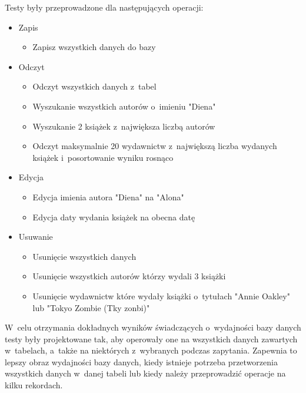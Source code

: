 Testy były przeprowadzone dla następujących operacji: 
\begin{itemize}
	 \item Zapis
  
  	\begin{itemize}
    		\item Zapisz wszystkich danych do bazy
	 \end{itemize}

	  \item Odczyt
	  
   	  \begin{itemize}
   		 \item Odczyt wszystkich danych z~tabel
	     \item Wyszukanie wszystkich autorów o~imieniu "Diena"
   		 \item Wyszukanie 2 książek z~największa liczbą autorów
     	\item Odczyt maksymalnie 20 wydawnictw z~największą liczba wydanych książek i~posortowanie wyniku rosnąco   
  		\end{itemize}
  		
 	  \item Edycja

 	  	\begin{itemize}
	    		\item Edycja imienia autora "Diena" na "Alona"
	    		\item Edycja daty wydania książek na obecna datę
		 \end{itemize}

	   \item Usuwanie
	   
	    	\begin{itemize}
	    		\item Usunięcie wszystkich danych
	    		\item Usunięcie wszystkich autorów którzy wydali 3 książki
	    		\item Usunięcie wydawnictw które wydały książki o~tytułach "Annie Oakley" lub "Tokyo Zombie (Tky zonbi)"
		 \end{itemize}	 
\end{itemize}

 W~celu otrzymania dokładnych wyników świadczących o~wydajności bazy danych testy były projektowane tak, aby operowały one na wszystkich danych zawartych w~tabelach, a~także na niektórych z~wybranych podczas zapytania. Zapewnia to lepszy obraz wydajności bazy danych, kiedy istnieje potrzeba przetworzenia wszystkich danych w~danej tabeli lub kiedy należy przeprowadzić operacje na kilku rekordach. 

